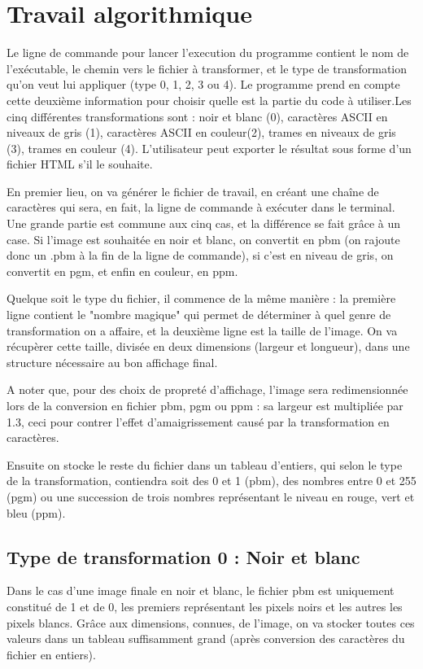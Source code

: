 \documentclass{article}
\begin{document}
\section{Travail algorithmique}
Le ligne de commande pour lancer l'execution du programme contient le nom de l'exécutable, le chemin vers le fichier à transformer, et le type de transformation qu'on veut lui appliquer (type 0, 1, 2, 3 ou 4). Le programme prend en compte cette deuxième information pour choisir quelle est la partie du code à utiliser.Les cinq différentes transformations sont : noir et blanc (0), caractères ASCII en niveaux de gris (1), caractères ASCII en couleur(2), trames en niveaux de gris (3), trames en couleur (4). L'utilisateur peut exporter le résultat sous forme d'un fichier HTML s'il le souhaite.
\newline

En premier lieu, on va générer le fichier de travail, en créant une chaîne de caractères qui sera, en fait, la ligne de commande à exécuter dans le terminal. Une grande partie est commune aux cinq cas, et la différence se fait grâce à un case. Si l'image est souhaitée en noir et blanc, on convertit en pbm (on rajoute donc un .pbm à la fin de la ligne de commande), si c'est en niveau de gris, on convertit en pgm, et enfin en couleur, en ppm. 
\newline

Quelque soit le type du fichier, il commence de la même manière : la première ligne contient le "nombre magique" qui permet de déterminer à quel genre de transformation on a affaire, et la deuxième ligne est la taille de l'image. On va récupèrer cette taille, divisée en deux dimensions (largeur et longueur), dans une structure nécessaire au bon affichage final. 
\newline

A noter que, pour des choix de propreté d'affichage, l'image sera redimensionnée lors de la conversion en fichier pbm, pgm ou ppm : sa largeur est multipliée par 1.3, ceci pour contrer l'effet d'amaigrissement causé par la transformation en caractères.
\newline

Ensuite on stocke le reste du fichier dans un tableau d'entiers, qui selon le type de la transformation, contiendra soit des 0 et 1 (pbm), des nombres entre 0 et 255 (pgm)  ou une succession de trois nombres représentant le niveau en rouge, vert et bleu (ppm). 

\subsection{Type de transformation 0 : Noir et blanc}
Dans le cas d'une image finale en noir et blanc, le fichier pbm est uniquement constitué de 1 et de 0, les premiers représentant les pixels noirs et les autres les pixels blancs. Grâce aux dimensions, connues, de l'image, on va stocker toutes ces valeurs dans un tableau suffisamment grand (après conversion des caractères du fichier en entiers). 
\newline
\end{document}
